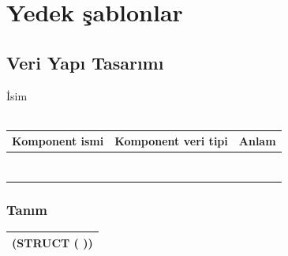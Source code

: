\documentclass[12pt, a4paper]{article}
\newcommand\fillin[1][3cm]{\makebox[#1]{\dotfill}}
\begin{document}

\section*{Yedek şablonlar}




\newpage
\subsection*{Veri Yapı Tasarımı}
İsim \fillin[5cm]\\
\vspace{0.5cm}\\
\begin{tabular}{| p{4cm} | p{4cm} | p{8cm} |  }
\hline			
Komponent ismi&Komponent veri tipi&Anlam\\
\hline
& & \\[10ex]
\hline  
& & \\[10ex]
\hline  
& & \\[10ex]
\hline  
& & \\[10ex]
\hline  
& & \\[10ex]
\hline  
& & \\[10ex]
\hline  
& & \\[10ex]
\hline  
\end{tabular}

\subsubsection*{Tanım}
\begin{tabular}{| p{17cm} |  }
\hline			
\vspace{0.5cm}
(STRUCT \fillin[3cm] (\fillin[10cm] ))\\[10ex]
\hline
\end{tabular}






\newpage
\end{document}
